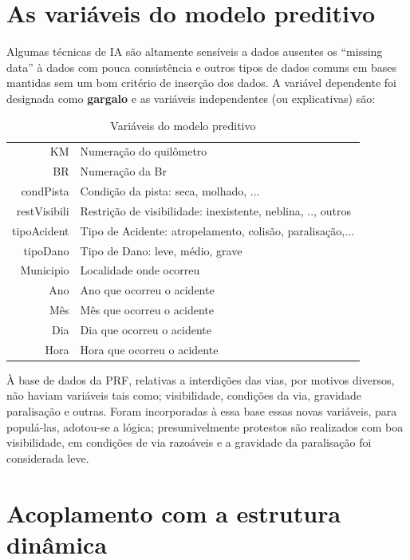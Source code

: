 \section{ As variáveis do modelo preditivo}

Algumas técnicas de IA são altamente sensíveis a dados ausentes os ``missing data'' à dados com pouca consistência e outros tipos de dados 
comuns em bases mantidas sem um bom critério de inserção dos dados. 
A variável dependente foi designada como \textbf{gargalo} e as variáveis independentes (ou explicativas) são:


\begin{table}[htbp]
 \centering
  \caption{Variáveis do modelo preditivo}
  
  \begin{tabular}{r|l} \hline
   KM & Numeração do quilômetro \\
   BR & Numeração da Br\\
   condPista & Condição da pista: seca, molhado, ... \\
   restVisibili & Restrição de visibilidade: inexistente, neblina, .., outros \\
   tipoAcident & Tipo de Acidente: atropelamento, colisão, paralisação,...\\
   tipoDano  & Tipo de Dano: leve, médio, grave \\
   Municipio  & Localidade onde ocorreu \\
   Ano & Ano que ocorreu o acidente \\
   Mês & Mês que ocorreu o acidente \\
   Dia & Dia que ocorreu o acidente \\
   Hora & Hora que ocorreu o acidente \\
  \end{tabular}
\end{table}

 
À base de dados da PRF, relativas a interdições das vias, por motivos diversos, não haviam variáveis tais como; visibilidade, condições da via, gravidade paralisação e outras.
Foram incorporadas à essa base essas novas variáveis, para populá-las, adotou-se a lógica; presumivelmente protestos são realizados com boa visibilidade, em condições de via razoáveis e a gravidade da paralisação foi considerada leve.


\pagebreak

\section{Acoplamento com a estrutura dinâmica}

